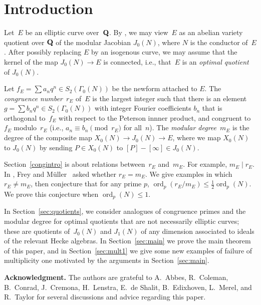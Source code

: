 \documentclass[10pt,twoside]{article}
\newcommand{\Q}{{\bf{Q}}}
\newcommand{\re}{r_{\scriptscriptstyle E}}
\newcommand{\me}{m_{\scriptscriptstyle E}}
\theoremstyle{definition}
\DeclareMathOperator{\ord}{ord}
\begin{document}

  
\section{Introduction}
Let~$E$ be an elliptic curve over~$\Q$.  By
\cite{breuil-conrad-diamond-taylor}, we may view~$E$ as an abelian
variety quotient over $\Q$ of the modular Jacobian $J_0(N)$, where $N$
is the conductor of~$E$.  After possibly replacing $E$ by an isogenous
curve, we may assume that the kernel of the map $J_0(N)\to E$ is
connected, i.e., that~$E$ is an {\em optimal quotient} of $J_0(N)$.

Let $f_E = \sum a_n q^n \in S_2(\Gamma_0(N))$ be the newform attached
to $E$.  The {\em congruence number}~$\re$ of~$E$ is the largest
integer such that there is an element $g =\sum b_n q^n \in
S_2(\Gamma_0(N))$ with integer Fourier coefficients $b_n$ that is
orthogonal to~$f_E$ with respect to the Peterson innner product, and
congruent to~$f_E$ modulo~$\re$ (i.e., $a_n \equiv b_n\pmod{\re}$ for
all~$n$).    The {\em modular
  degree}~$\me$ is the degree of the composite map $X_0(N)\to
J_0(N)\to E$, where we map $X_0(N)$ to $J_0(N)$ by sending $P\in
X_0(N)$ to $[P]-[\infty] \in J_0(N)$.

Section~\ref{congintro} is about relations between~$\re$ and~$\me$.
For example, $\me \mid \re$.  In \cite[Q.~4.4]{frey-muller}, Frey and
M{\"u}ller~ asked whether $\re = \me$.  We give examples in which $\re
\neq \me$, then conjecture that for any prime $p$, $\ord_p(\re/\me)
\leq \frac{1}{2}\ord_p(N)$.  We prove this conjecture when
$\ord_p(N)\leq 1$.

In Section~\ref{sec:quotients}, we consider analogues of congruence
primes and the modular degree for optimal quotients that are not
necessarily elliptic curves; these are quotients of~$J_0(N)$ and
$J_1(N)$ of any dimension associated to ideals of the relevant Hecke
algebras.  In Section~\ref{sec:main} we prove the main theorem of this
paper, and in Section~\ref{sec:mult1} we give some new examples of
failure of multiplicity one motivated by the arguments in
Section~\ref{sec:main}.


\smallskip

{\bf \noindent Acknowledgment.} The authors are grateful to A.~Abbes,
R.~Coleman, B.~Conrad, J.~Cremona, H.~Lenstra, E.~de Shalit,
B.~Edixhoven, L.~Merel, and R.~Taylor for several discussions and
advice regarding this paper.
\end{document}
